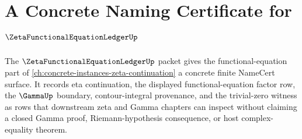 \chapter{A Concrete Naming Certificate for $\ZetaFunctionalEquationLedgerUp$}
\label{ch:concrete-instances-zeta-functional-equation-ledger-namecert}

The $\ZetaFunctionalEquationLedgerUp$ packet gives the functional-equation part of \autoref{ch:concrete-instances-zeta-continuation} a concrete finite NameCert surface. It records eta continuation, the displayed functional-equation factor row, the $\GammaUp$ boundary, contour-integral provenance, and the trivial-zero witness as rows that downstream zeta and Gamma chapters can inspect without claiming a closed Gamma proof, Riemann-hypothesis consequence, or host complex-equality theorem.

